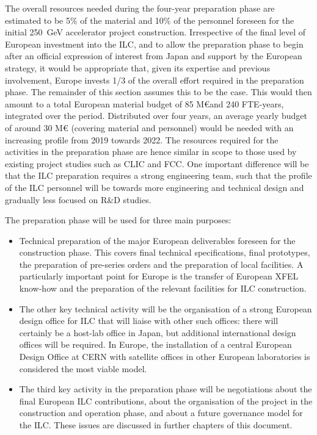 \documentclass[%
 reprint,
 amsmath,amssymb,
 aps,
]{revtex4-1}
\begin{document}
The overall resources needed during the four-year preparation phase are estimated to be 5\% of the material and 10\% of the personnel 
foreseen for the initial 250~GeV accelerator project construction. Irrespective of the final level of European investment into the ILC, 
and to allow the preparation phase to begin after an official expression of interest from Japan and support by the European strategy, 
it would be appropriate that, given its expertise and previous involvement, Europe invests 1/3 of the overall effort required in the 
preparation phase. The remainder of this section assumes this to be the case. This would then amount to a total European material 
budget of 85 M\euro and 240 FTE-years, integrated over the period.
Distributed over four years, an average yearly budget of around 30 M\euro{} (covering material and personnel) would be needed with an 
increasing profile from 2019 towards 2022. The resources required for the activities in the preparation phase are hence similar in 
scope to those used by existing project studies such as CLIC and FCC. One important difference will be that the ILC preparation 
requires a strong engineering team, such that the profile of the ILC personnel will be towards more engineering and technical 
design and gradually less focused on R\&D studies.

The preparation phase will be used for three main purposes:

\begin{itemize}
\item 
Technical preparation of the major European deliverables foreseen for the construction phase. This covers final technical specifications, final prototypes, the preparation of pre-series orders and the preparation of local facilities. A particularly important point for Europe is the transfer of European XFEL know-how and the preparation of the relevant facilities for ILC construction.
\item
The other key technical activity will be the organisation of a strong European design office for ILC that will liaise with other such offices: there will certainly be a host-lab office in Japan, but additional international design offices will be required. In Europe, the installation of a central European Design Office at CERN with satellite offices in other European laboratories is considered the most viable model.
\item 
The third key activity in the preparation phase will be negotiations about the final European ILC contributions, about the organisation of the project in the construction and operation phase, and about a future governance model for the ILC. These issues are discussed in further chapters of this document.
\end{itemize}
\end{document}
